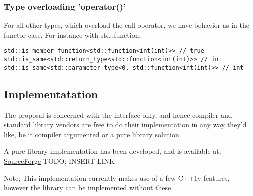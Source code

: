 \subsubsection{Type overloading 'operator()'}
For all other types, which overload the call operator, we have behavior as in
the functor case. For instance with std::function;
\begin{verbatim}
std::is_member_function<std::function<int(int)>> // true
std::is_same<std::return_type<std::function<int(int)>> // int
std::is_same<std::parameter_type<0, std::function<int(int)>> // int
\end{verbatim}

\subsection{Implementatation}
The proposal is concerned with the interface only, and hence compiler and
standard library vendors are free to do their implementation in any way they'd
like, be it compiler argumented or a pure library solution.

A pure library implementation has been developed, and is available at;
\href{}{SourceForge}
TODO: INSERT LINK

Note; This implementation currently makes use of a few C++1y features, however
the library can be implemented without these.
